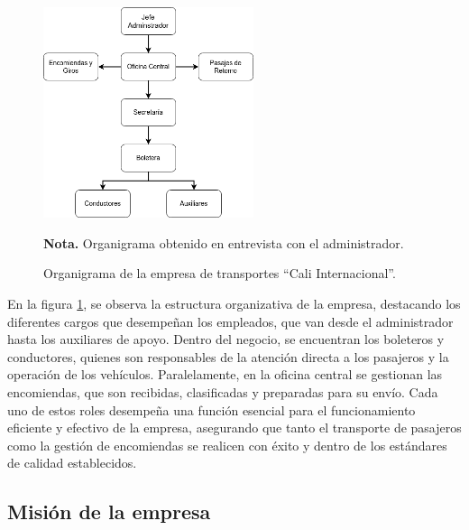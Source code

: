 	\vspace{0.3cm} %
	
	\begin{figure}[h] %
		\caption[Organigrama empresa]
		{\newline Organigrama de la empresa de transportes ``Cali Internacional''.} %
		\centering
		\includegraphics[width=0.55\textwidth]{imagenes/figura1_1.png} %
		
		\begin{flushleft}
			\hspace{1.20cm} \textbf{Nota.} Organigrama obtenido en entrevista con el administrador. %
		\end{flushleft}
		\vspace{-16pt}
		\label{fig:figura1_1} %
	\end{figure}
	
	En la figura \ref{fig:figura1_1}, se observa la estructura organizativa de la empresa, destacando los diferentes cargos que desempeñan los empleados, que van desde el administrador hasta los auxiliares de apoyo. Dentro del negocio, se encuentran los boleteros y conductores, quienes son responsables de la atención directa a los pasajeros y la operación de los vehículos. Paralelamente, en la oficina central se gestionan las encomiendas, que son recibidas, clasificadas y preparadas para su envío. Cada uno de estos roles desempeña una función esencial para el funcionamiento eficiente y efectivo de la empresa, asegurando que tanto el transporte de pasajeros como la gestión de encomiendas se realicen con éxito y dentro de los estándares de calidad establecidos.
	
	\subsection*{Misión de la empresa}
	
